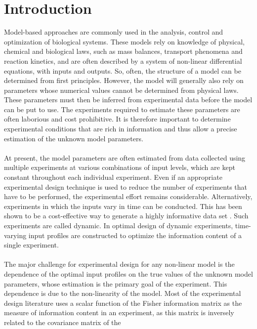 \section{Introduction}
Model-based approaches are commonly used in the analysis, control and optimization of biological systems. These models rely on knowledge of physical, chemical and biological laws, such as mass balances, transport phenomena and reaction kinetics, and are often described by a system of non-linear differential equations, with inputs and outputs. So, often, the structure of a model can be determined from first principles. However, the model will generally also rely on parameters whose numerical values cannot be determined from physical laws. These parameters must then be inferred from experimental data before the model can be put to use. The experiments required to estimate these parameters are often laborious and cost prohibitive. It is therefore important to determine experimental conditions that are rich in information and thus allow a precise estimation of the unknown model parameters.
\\
\\
At present, the model parameters are often estimated from data collected using multiple experiments at various combinations of input levels, which are kept constant throughout each individual experiment. Even if an appropriate experimental design technique is used to reduce the number of experiments that have to be performed, the experimental effort remains considerable. Alternatively, experiments in which the inputs vary in time can be conducted. This has been shown to be a cost-effective way to generate a highly informative data set \parencite{versyck}. Such experiments are called dynamic. In optimal design of dynamic experiments, time-varying input profiles are constructed to optimize the information content of a single experiment.
\\
\\
The major challenge for experimental design for any non-linear model is the dependence of the optimal input profiles on the true values of the unknown model parameters, whose estimation is the primary goal of the experiment. This dependence is due to the non-linearity of the model. Most of the experimental design literature uses a scalar function of the Fisher information matrix as the measure of information content in an experiment, as this matrix is inversely related to the covariance matrix of the
